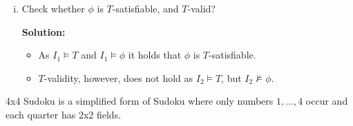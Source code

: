 \documentclass[11pt,a4paper]{uebung}
\newcommand{\solution}[1]{\par {\bf Solution:}\\#1}
\begin{document}
\begin{enumerate}
\begin{enumerate}[(i)]
  \solution{
  $D_2 = \mathbb{N}$, $I_2(<) = \{ \langle p, q \rangle \mid p, q \in \mathbb{N},\ p < q \}$
  (i.e., the `usual' less-than relation over $\mathbb{N}$).

  Showing that $I_2 \models T$ is completely analogous to the previous
  exercise.

  It remains to show that $I_2 \not \models \phi$:
  Let $x=1,y=2$, then $I_2(x<y)=1$. As $I_2$ is defined over $\mathbb{N}$,
  there are no numbers between $1$ and $2$, i.e., $\not \exists z$ with
  $1<z \land z<2$. So $I_2(\exists z (1<z \land z<2) )=0$ and
  $I_2((1<2)\rightarrow \exists z( 1<z \land z<2))=0$.
 
  Therefore $I_2(\forall x,y (x<y)\rightarrow \exists z( x<z \land z<y))=0$
  and so $I_2 \not \models \phi$.
  }

\item 
  Check whether $\phi$ is $T$-satisfiable, and $T$-valid?

  \solution{
    \begin{itemize}
    \item As $I_1 \models T$ and $I_1 \models \phi$ it holds that $\phi$ is
      $T$-satisfiable.
    \item $T$-validity, however, does not hold as $I_2 \models T$, but $I_2
      \not \models \phi$.
    \end{itemize}
  }

\end{enumerate}

\end{enumerate}


\newpage


4x4 Sudoku is a simplified form of Sudoku where only numbers $1, \ldots, 4$
occur and each quarter has 2x2 fields.


\begin{figure}[h!]
  \centering
\end{figure}
\end{document}

